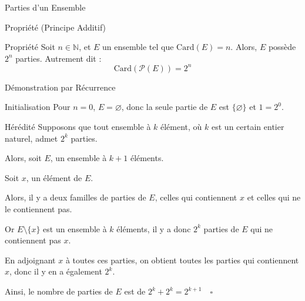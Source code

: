 \documentclass{cours}
\begin{document}
\begin{Gpartie}{Parties d'un Ensemble}
\begin{Spartie}{Propriété (Principe Additif)}
        \end{Spartie}
        \begin{Spartie}{Propriété}
            Soit $n\in\mathbb{N}$, et $E$ un ensemble tel que $\text{Card}(E)=n$. Alors, $E$ possède $2^n$ parties. Autrement dit :
            \[\text{Card}(\mathcal{P}(E))=2^n\]
            \begin{SSpartie}{Démonstration par Récurrence}
                \begin{SSSpartie}{Initialisation}
                    Pour $n=0$, $E=\varnothing$, donc la seule partie de $E$ est $\big\{\varnothing\big\}$ et $1=2^0$.
                \end{SSSpartie}
                \begin{SSSpartie}{Hérédité}
                    Supposons que tout ensemble à $k$ élément, où $k$ est un certain entier naturel, admet $2^k$ parties.

                    Alors, soit $E$, un ensemble à $k+1$ éléments.

                    Soit $x$, un élément de $E$.

                    Alors, il y a deux familles de parties de $E$, celles qui contiennent $x$ et celles qui ne le contiennent pas.

                    Or $E\setminus\big\{x\big\}$ est un ensemble à $k$ éléments, il y a donc $2^k$ parties de $E$ qui ne contiennent pas $x$.

                    En adjoignant $x$ à toutes ces parties, on obtient toutes les parties qui contiennent $x$, donc il y en a également $2^k$.
                    
                    Ainsi, le nombre de parties de $E$ est de $2^k+2^k=2^{k+1}\quad\square$
                \end{SSSpartie}
            \end{SSpartie}
        \end{Spartie}
    \end{Gpartie}
    \pagebreak
\end{document}
